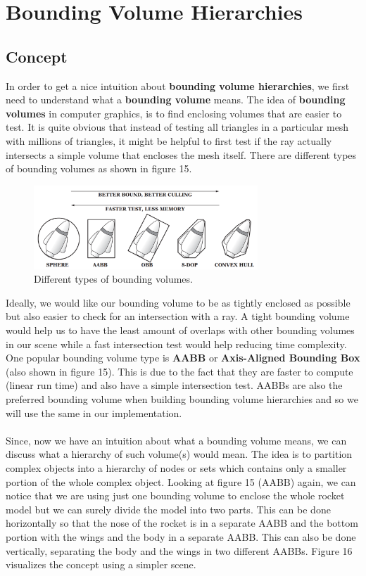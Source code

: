 \documentclass[11pt,a4paper]{article}
\begin{document}
\section{Bounding Volume Hierarchies}
\subsection{Concept}
In order to get a nice intuition about \textbf{bounding volume hierarchies}, we first need to understand what a \textbf{bounding volume} means. The idea of \textbf{bounding volumes} in computer graphics, is to find enclosing volumes that are easier to test. It is quite obvious that instead of testing all triangles in a particular mesh with millions of triangles, it might be helpful to first test if the ray actually intersects a simple volume that encloses the mesh itself. There are different types of bounding volumes as shown in figure 15.
\begin{figure}[H]
	\centering
	\captionsetup{justification=centering,margin=2cm}
	\includegraphics[width=0.75\textwidth]{boundingvolumes}
	\caption{Different types of bounding volumes. \protect\cite{ericson2004real}}
\end{figure}
Ideally, we would like our bounding volume to be as tightly enclosed as possible but also easier to check for an intersection with a ray. A tight bounding volume would help us to have the least amount of overlaps with other bounding volumes in our scene while a fast intersection test would help reducing time complexity. One popular bounding volume type is \textbf{AABB} or \textbf{Axis-Aligned Bounding Box} (also shown in figure 15). This is due to the fact that they are faster to compute (linear run time) and also have a simple intersection test. AABBs are also the preferred bounding volume when building bounding volume hierarchies and so we will use the same in our implementation.
\\~\\
\noindent
Since, now we have an intuition about what a bounding volume means, we can discuss what a hierarchy of such volume(s) would mean. The idea is to partition complex objects into a hierarchy of nodes or sets which contains only a smaller portion of the whole complex object. Looking at figure 15 (AABB) again, we can notice that we are using just one bounding volume to enclose the whole rocket model but we can surely divide the model into two parts. This can be done horizontally so that the nose of the rocket is in a separate AABB and the bottom portion with the wings and the body in a separate AABB. This can also be done vertically, separating the body and the wings in two different AABBs. Figure 16 visualizes the concept using a simpler scene. 
\end{document}
